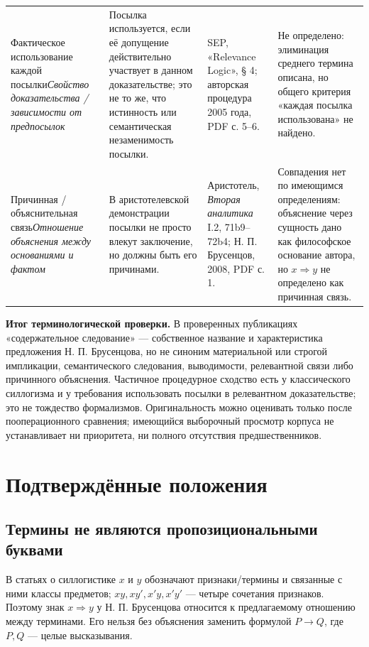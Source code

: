 \documentclass[12pt,a4paper]{article}
\begin{document}
{\begin{longtable}{P{0.18\textwidth}P{0.28\textwidth}P{0.18\textwidth}P{0.23\textwidth}}
Фактическое использование каждой посылки\newline\emph{Свойство доказательства / зависимости от предпосылок} & Посылка используется, если её допущение действительно участвует в данном доказательстве; это не то же, что истинность или семантическая незаменимость посылки. & SEP, «Relevance Logic», § 4; авторская процедура 2005 года, PDF с. 5–6. & Не определено: элиминация среднего термина описана, но общего критерия «каждая посылка использована» не найдено. \\
Причинная / объяснительная связь\newline\emph{Отношение объяснения между основаниями и фактом} & В аристотелевской демонстрации посылки не просто влекут заключение, но должны быть его причинами. & Аристотель, \emph{Вторая аналитика} I.2, 71b9–72b4; Н. П. Брусенцов, 2008, PDF с. 1. & Совпадения нет по имеющимся определениям: объяснение через сущность дано как философское основание автора, но \(x\Rightarrow y\) не определено как причинная связь. \\
\bottomrule
\end{longtable}
}

\textbf{Итог терминологической проверки.} В проверенных публикациях «содержательное следование» — собственное название и характеристика предложения Н. П. Брусенцова, но не синоним материальной или строгой импликации, семантического следования, выводимости, релевантной связи либо причинного объяснения. Частичное процедурное сходство есть у классического силлогизма и у требования использовать посылки в релевантном доказательстве; это не тождество формализмов. Оригинальность можно оценивать только после пооперационного сравнения; имеющийся выборочный просмотр корпуса не устанавливает ни приоритета, ни полного отсутствия предшественников.

\section{Подтверждённые положения}

\subsection{Термины не являются пропозициональными буквами}

В статьях о силлогистике \(x\) и \(y\) обозначают признаки/термины и связанные с ними классы предметов; \(xy,xy',x'y,x'y'\) — четыре сочетания признаков. Поэтому знак \(x\Rightarrow y\) у Н. П. Брусенцова относится к предлагаемому отношению между терминами. Его нельзя без объяснения заменить формулой \(P\to Q\), где \(P,Q\) — целые высказывания.
\end{document}
